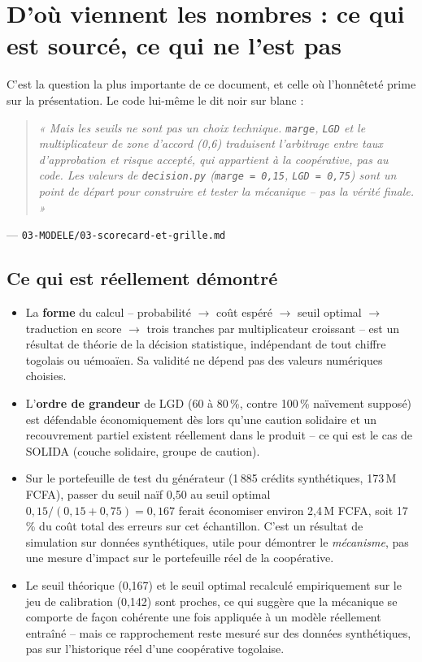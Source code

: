 \documentclass[11pt,a4paper]{article}
\begin{document}
\section{D'où viennent les nombres : ce qui est sourcé, ce qui ne l'est pas}

C'est la question la plus importante de ce document, et celle où l'honnêteté prime sur la
présentation. Le code lui-même le dit noir sur blanc :

\begin{quote}\itshape
« Mais les seuils ne sont pas un choix technique. \texttt{marge}, \texttt{LGD} et le
multiplicateur de zone d'accord (0,6) traduisent l'arbitrage entre taux d'approbation et risque
accepté, qui appartient à la coopérative, pas au code. Les valeurs de \texttt{decision.py}
(\texttt{marge = 0,15}, \texttt{LGD = 0,75}) sont un point de départ pour construire et tester la
mécanique -- pas la vérité finale. »
\end{quote}
\hfill --- \texttt{03-MODELE/03-scorecard-et-grille.md}

\subsection{Ce qui est réellement démontré}

\begin{itemize}
\item La \textbf{forme} du calcul -- probabilité $\to$ coût espéré $\to$ seuil optimal $\to$
traduction en score $\to$ trois tranches par multiplicateur croissant -- est un résultat de
théorie de la décision statistique, indépendant de tout chiffre togolais ou uémoaïen. Sa validité
ne dépend pas des valeurs numériques choisies.
\item L'\textbf{ordre de grandeur} de LGD (60 à 80\,\%, contre 100\,\% naïvement supposé) est
défendable économiquement dès lors qu'une caution solidaire et un recouvrement partiel existent
réellement dans le produit -- ce qui est le cas de SOLIDA (couche solidaire, groupe de caution).
\item Sur le portefeuille de test du générateur (1\,885 crédits synthétiques, 173\,M FCFA), passer
du seuil naïf 0,50 au seuil optimal $0{,}15/(0{,}15+0{,}75) = 0{,}167$ ferait économiser environ
2,4\,M FCFA, soit 17\,\% du coût total des erreurs sur cet échantillon. C'est un résultat de
simulation sur données synthétiques, utile pour démontrer le \emph{mécanisme}, pas une mesure
d'impact sur le portefeuille réel de la coopérative.
\item Le seuil théorique (0,167) et le seuil optimal recalculé empiriquement sur le jeu de
calibration (0,142) sont proches, ce qui suggère que la mécanique se comporte de façon cohérente
une fois appliquée à un modèle réellement entraîné -- mais ce rapprochement reste mesuré sur des
données synthétiques, pas sur l'historique réel d'une coopérative togolaise.
\end{itemize}
\end{document}
